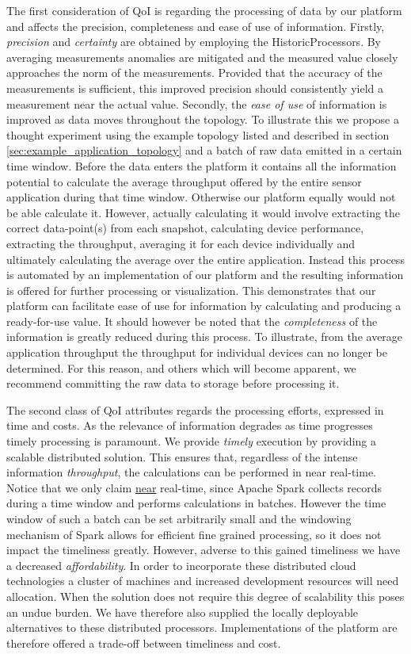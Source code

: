 The first consideration of QoI is regarding the processing of data by our platform and affects the precision, completeness and ease of use of information. Firstly, \emph{precision} and \emph{certainty} are obtained by employing the HistoricProcessors. By averaging measurements anomalies are mitigated and the measured value closely approaches the norm of the measurements. Provided that the accuracy of the measurements is sufficient, this improved precision should consistently yield a measurement near the actual value. Secondly, the \emph{ease of use} of information is improved as data moves throughout the topology. To illustrate this we propose a thought experiment using the example topology listed and described in section \ref{sec:example_application_topology} and a batch of raw data emitted in a certain time window. Before the data enters the platform it contains all the information potential to calculate the average throughput offered by the entire sensor application during that time window. Otherwise our platform equally would not be able calculate it. However, actually calculating it would involve extracting the correct data-point(s) from each snapshot, calculating device performance, extracting the throughput, averaging it for each device individually and ultimately calculating the average over the entire application. Instead this process is automated by an implementation of our platform and the resulting information is offered for further processing or visualization. This demonstrates that our platform can facilitate ease of use for information by calculating and producing a ready-for-use value. It should however be noted that the \emph{completeness} of the information is greatly reduced during this process. To illustrate, from the average application throughput the throughput for individual devices can no longer be determined. For this reason, and others which will become apparent, we recommend committing the raw data to storage before processing it.

The second class of QoI attributes regards the processing efforts, expressed in time and costs. As the relevance of information degrades as time progresses timely processing is paramount. We provide \emph{timely} execution by providing a scalable distributed solution. This ensures that, regardless of the intense information \emph{throughput}, the calculations can be performed in near real-time. Notice that we only claim \underline{near} real-time, since Apache Spark collects records during a time window and performs calculations in batches. However the time window of such a batch can be set arbitrarily small and the windowing mechanism of Spark allows for efficient fine grained processing, so it does not impact the timeliness greatly. However, adverse to this gained timeliness we have a decreased \emph{affordability}. In order to incorporate these distributed cloud technologies a cluster of machines and increased development resources will need allocation. When the solution does not require this degree of scalability this poses an undue burden. We have therefore also supplied the locally deployable alternatives to these distributed processors. Implementations of the platform are therefore offered a trade-off between timeliness and cost.
	
